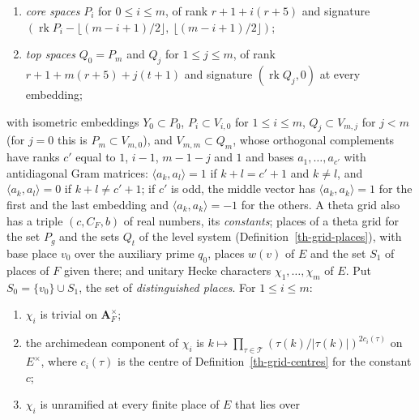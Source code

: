 \begin{definition}
\begin{enumerate}
  $r+jt+i(r+6)$ and signature
  $(\operatorname{rk}V_{i,j}-\lfloor(m-j)/2\rfloor,\ \lfloor(m-j)/2\rfloor)$
  at every embedding;
\item \emph{core spaces} $P_i$ for $0\leq i\leq m$, of rank $r+1+i(r+5)$ and
  signature $(\operatorname{rk}P_i-\lfloor(m-i+1)/2\rfloor,\ \lfloor(m-i+1)/2\rfloor)$;
\item \emph{top spaces} $Q_0=P_m$ and $Q_j$ for $1\leq j\leq m$, of rank
  $r+1+m(r+5)+j(t+1)$ and signature $(\operatorname{rk}Q_j,0)$ at every
  embedding;
\end{enumerate}
with isometric embeddings $Y_0\subset P_0$, $P_i\subset V_{i,0}$ for
$1\leq i\leq m$, $Q_j\subset V_{m,j}$ for $j<m$ (for $j=0$ this is
$P_m\subset V_{m,0}$), and $V_{m,m}\subset Q_m$, whose orthogonal complements
have ranks $c'$ equal to $1$, $i-1$, $m-1-j$ and $1$ and bases
$a_1,\ldots,a_{c'}$ with antidiagonal Gram matrices:
$\langle a_k,a_l\rangle=1$ if $k+l=c'+1$ and $k\neq l$, and
$\langle a_k,a_l\rangle=0$ if $k+l\neq c'+1$; if $c'$ is odd, the middle
vector has $\langle a_k,a_k\rangle=1$ for the first and the last embedding and
$\langle a_k,a_k\rangle=-1$ for the others.
A theta grid also has a triple $(c,C_F,b)$ of
real numbers, its \emph{constants}; places of a theta grid for the set $P_g$
and the sets $Q_t$ of the level system (Definition~\ref{th-grid-places}),
with base place $v_0$ over the auxiliary prime $q_0$, places $w(v)$ of $E$ and
the set $S_1$ of places of $F$ given there; and unitary Hecke characters
$\chi_1,\ldots,\chi_m$ of $E$. Put $S_0=\{v_0\}\cup S_1$, the set of
\emph{distinguished places}. For $1\leq i\leq m$:
\begin{enumerate}
\item[(a)] $\chi_i$ is trivial on $\mathbf A_F^\times$;
\item[(b)] the archimedean component of $\chi_i$ is
  $k\mapsto\prod_{\tau\in\mathcal T}(\tau(k)/|\tau(k)|)^{2c_i(\tau)}$ on
  $E^\times$, where $c_i(\tau)$ is the centre of
  Definition~\ref{th-grid-centres} for the constant $c$;
\item[(c)] $\chi_i$ is unramified at every finite place of $E$ that lies over

\end{enumerate}
\end{definition}
